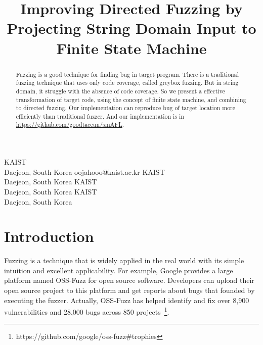\documentclass[12pt]{sigplanconf}
\begin{document}
\setlength{\pdfpageheight}{\paperheight}
\setlength{\pdfpagewidth}{\paperwidth}


\title{Improving Directed Fuzzing by Projecting String Domain Input to Finite State Machine}

{KAIST \\
    Daejeon, South Korea
}
{oojahooo@kaist.ac.kr}
{KAIST \\
    Daejeon, South Korea
}
{}
{KAIST \\
    Daejeon, South Korea
}
{}
{KAIST \\
    Daejeon, South Korea
}
{}

\maketitle

\begin{abstract}
    Fuzzing is a good technique for finding bug in target program. There is a
    traditional fuzzing technique that uses only code coverage, called greybox
    fuzzing. But in string domain, it struggle with the absence of code coverage.
    So we present a effective transformation of target code, using the concept of
    finite state machine, and combining to directed fuzzing. Our implementation
    can reproduce bug of target location more efficiently than traditional fuzzer.
    And our implementation is in \url{https://github.com/goodtaeeun/smAFL}.
\end{abstract}

\section{Introduction}
Fuzzing is a technique that is widely applied in the real world with its simple intuition and excellent applicability.
For example, Google provides a large platform named OSS-Fuzz for open source software. Developers can upload their open
source project to this platform and get reports about bugs that founded by executing the fuzzer. Actually, OSS-Fuzz has
helped identify and fix over 8,900 vulnerabilities and 28,000 bugs across 850 projects~\footnote{https://github.com/google/oss-fuzz\#trophies}.
\end{document}
